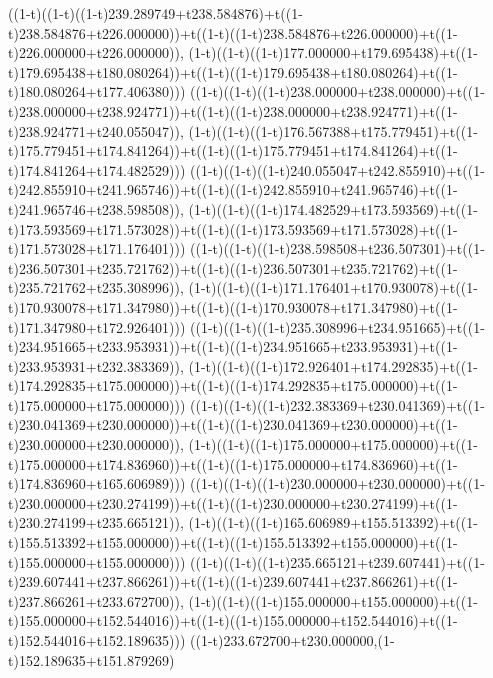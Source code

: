 ((1-t)((1-t)((1-t)239.289749+t238.584876)+t((1-t)238.584876+t226.000000))+t((1-t)((1-t)238.584876+t226.000000)+t((1-t)226.000000+t226.000000)),                                     (1-t)((1-t)((1-t)177.000000+t179.695438)+t((1-t)179.695438+t180.080264))+t((1-t)((1-t)179.695438+t180.080264)+t((1-t)180.080264+t177.406380)))
((1-t)((1-t)((1-t)238.000000+t238.000000)+t((1-t)238.000000+t238.924771))+t((1-t)((1-t)238.000000+t238.924771)+t((1-t)238.924771+t240.055047)),                                     (1-t)((1-t)((1-t)176.567388+t175.779451)+t((1-t)175.779451+t174.841264))+t((1-t)((1-t)175.779451+t174.841264)+t((1-t)174.841264+t174.482529)))
((1-t)((1-t)((1-t)240.055047+t242.855910)+t((1-t)242.855910+t241.965746))+t((1-t)((1-t)242.855910+t241.965746)+t((1-t)241.965746+t238.598508)),                                     (1-t)((1-t)((1-t)174.482529+t173.593569)+t((1-t)173.593569+t171.573028))+t((1-t)((1-t)173.593569+t171.573028)+t((1-t)171.573028+t171.176401)))
((1-t)((1-t)((1-t)238.598508+t236.507301)+t((1-t)236.507301+t235.721762))+t((1-t)((1-t)236.507301+t235.721762)+t((1-t)235.721762+t235.308996)),                                     (1-t)((1-t)((1-t)171.176401+t170.930078)+t((1-t)170.930078+t171.347980))+t((1-t)((1-t)170.930078+t171.347980)+t((1-t)171.347980+t172.926401)))
((1-t)((1-t)((1-t)235.308996+t234.951665)+t((1-t)234.951665+t233.953931))+t((1-t)((1-t)234.951665+t233.953931)+t((1-t)233.953931+t232.383369)),                                     (1-t)((1-t)((1-t)172.926401+t174.292835)+t((1-t)174.292835+t175.000000))+t((1-t)((1-t)174.292835+t175.000000)+t((1-t)175.000000+t175.000000)))
((1-t)((1-t)((1-t)232.383369+t230.041369)+t((1-t)230.041369+t230.000000))+t((1-t)((1-t)230.041369+t230.000000)+t((1-t)230.000000+t230.000000)),                                     (1-t)((1-t)((1-t)175.000000+t175.000000)+t((1-t)175.000000+t174.836960))+t((1-t)((1-t)175.000000+t174.836960)+t((1-t)174.836960+t165.606989)))
((1-t)((1-t)((1-t)230.000000+t230.000000)+t((1-t)230.000000+t230.274199))+t((1-t)((1-t)230.000000+t230.274199)+t((1-t)230.274199+t235.665121)),                                     (1-t)((1-t)((1-t)165.606989+t155.513392)+t((1-t)155.513392+t155.000000))+t((1-t)((1-t)155.513392+t155.000000)+t((1-t)155.000000+t155.000000)))
((1-t)((1-t)((1-t)235.665121+t239.607441)+t((1-t)239.607441+t237.866261))+t((1-t)((1-t)239.607441+t237.866261)+t((1-t)237.866261+t233.672700)),                                     (1-t)((1-t)((1-t)155.000000+t155.000000)+t((1-t)155.000000+t152.544016))+t((1-t)((1-t)155.000000+t152.544016)+t((1-t)152.544016+t152.189635)))
((1-t)233.672700+t230.000000,(1-t)152.189635+t151.879269)
